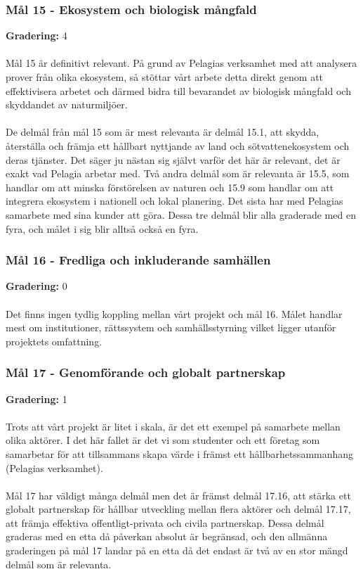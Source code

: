 \subsubsection{Mål 15 - Ekosystem och biologisk mångfald}
\textbf{Gradering:} 4 
\\\\
Mål 15 är definitivt relevant. På grund av Pelagias verksamhet med att analysera prover från olika ekosystem, så stöttar vårt arbete detta direkt genom att effektivisera arbetet och därmed bidra till bevarandet av biologisk mångfald och skyddandet av naturmiljöer.
\\\\
De delmål från mål 15 som är mest relevanta är delmål 15.1, att skydda, återställa och främja ett hållbart nyttjande av land och sötvattenekosystem och deras tjänster. Det säger ju nästan sig självt varför det här är relevant, det är exakt vad Pelagia arbetar med. Två andra delmål som är relevanta är 15.5, som handlar om att minska förstörelsen av naturen och 15.9 som handlar om att integrera ekosystem i nationell och lokal planering. Det sista har med Pelagias samarbete med sina kunder att göra. Dessa tre delmål blir alla graderade med en fyra, och målet i sig blir alltså också en fyra.

\subsubsection{Mål 16 - Fredliga och inkluderande samhällen}
\textbf{Gradering:} 0 
\\\\
Det finns ingen tydlig koppling mellan vårt projekt och mål 16. Målet handlar mest om institutioner, rättssystem och samhällsstyrning vilket ligger utanför projektets omfattning.

\subsubsection{Mål 17 - Genomförande och globalt partnerskap}
\textbf{Gradering:} 1 
\\\\
Trots att vårt projekt är litet i skala, är det ett exempel på samarbete mellan olika aktörer. I det här fallet är det vi som studenter och ett företag som samarbetar för att tillsammans skapa värde i främst ett hållbarhetssammanhang (Pelagias verksamhet).
\\\\
Mål 17 har väldigt många delmål men det är främst delmål 17.16, att stärka ett globalt partnerskap för hållbar utveckling mellan flera aktörer och delmål 17.17, att främja effektiva offentligt-privata och civila partnerskap. Dessa delmål graderas med en etta då påverkan absolut är begränsad, och den allmänna graderingen på mål 17 landar på en etta då det endast är två av en stor mängd delmål som är relevanta.


